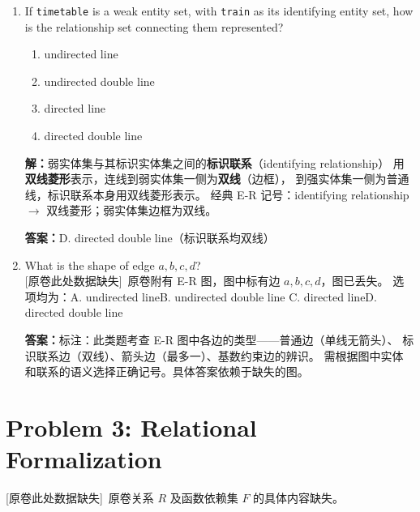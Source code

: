 \documentclass[11pt,a4paper]{article}
\newcommand{\solution}{\par\noindent\textcolor{ansblue}{\textbf{解：}}}
\newcommand{\answer}{\par\noindent\textcolor{ansred}{\textbf{答案：}}}
\newcommand{\missingnote}{\textcolor{ansred}{[原卷此处数据缺失]}}
\begin{document}
\begin{enumerate}[leftmargin=*,itemsep=6pt]

\item If \texttt{timetable} is a weak entity set, with \texttt{train} as its
  identifying entity set, how is the relationship set connecting them represented?

  \begin{enumerate}[label=\Alph*.]
    \item undirected line
    \item undirected double line
    \item directed line
    \item directed double line
  \end{enumerate}

  \solution 弱实体集与其标识实体集之间的\textbf{标识联系}（identifying relationship）
  用\textbf{双线菱形}表示，连线到弱实体集一侧为\textbf{双线}（边框），
  到强实体集一侧为普通线，标识联系本身用双线菱形表示。
  经典 E-R 记号：identifying relationship $\to$ 双线菱形；弱实体集边框为双线。

  \answer \textcolor{ansred}{D. directed double line}（标识联系均双线）

\item[\textcolor{gray}{2--5}] What is the shape of edge $a, b, c, d$?\\
  \missingnote\ 原卷附有 E-R 图，图中标有边 $a,b,c,d$，图已丢失。
  选项均为：A. undirected line\quad B. undirected double line\quad
  C. directed line\quad D. directed double line

  \answer 标注：此类题考查 E-R 图中各边的类型——普通边（单线无箭头）、
  标识联系边（双线）、箭头边（最多一）、基数约束边的辨识。
  需根据图中实体和联系的语义选择正确记号。具体答案依赖于缺失的图。

\end{enumerate}

\section*{Problem 3: Relational Formalization}

\missingnote\ 原卷关系 $R$ 及函数依赖集 $F$ 的具体内容缺失。
\end{document}
